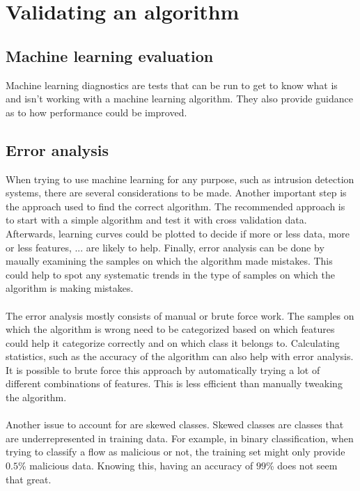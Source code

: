 \chapter{Validating an algorithm}

\section{Machine learning evaluation}
Machine learning diagnostics are tests that can be run to get to know what is and isn't working with a machine learning algorithm. They also provide guidance as to how performance could be improved. 

\section{Error analysis}
\label{errorAnalysis}
When trying to use machine learning for any purpose, such as intrusion detection systems, there are several considerations to be made. Another important step is the approach used to find the correct algorithm. 
The recommended approach is to start with a simple algorithm and test it with cross validation data. Afterwards, learning curves could be plotted to decide if more or less data, more or less features, ... are likely to help. Finally, error analysis can be done by maually examining the samples on which the algorithm made mistakes. This could help to spot any systematic trends in the type of samples on which the algorithm is making mistakes.\\\\
The error analysis mostly consists of manual or brute force work. The samples on which the algorithm is wrong need to be categorized based on which features could help it categorize correctly and on which class it belongs to. Calculating statistics, such as the accuracy of the algorithm can also help with error analysis. It is possible to brute force this approach by automatically trying a lot of different combinations of features. This is less efficient than manually tweaking the algorithm.\\\\
Another issue to account for are skewed classes. Skewed classes are classes that are underrepresented in training data. For example, in binary classification, when trying to classify a flow as malicious or not, the training set might only provide $0.5$\% malicious data. Knowing this, having an accuracy of $99$\% does not seem that great.

